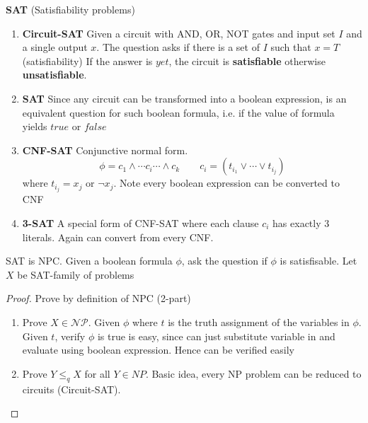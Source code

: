 \documentclass[11pt]{article}
\begin{document}
\begin{example}
    \textbf{SAT} (Satisfiability problems)
    \begin{enumerate}
        \item \textbf{Circuit-SAT} Given a circuit with AND, OR, NOT gates and input set $I$ and a single output $x$. The question asks if there is a set of $I$ such that $x = T$ (satisfiability) If the answer is $yet$, the circuit is \textbf{satisfiable} otherwise \textbf{unsatisfiable}. 
        \item \textbf{SAT} Since any circuit can be transformed into a boolean expression, is an equivalent question for such boolean formula, i.e. if the value of formula yields $true$ or $false$
        \item \textbf{CNF-SAT} Conjunctive normal form. 
        \[
            \phi = c_1 \land \cdots c_i  \cdots \land c_k  \quad \quad c_i = (t_{i_1} \lor \cdots \lor t_{i_j})
        \]
        where $t_{i_j} = x_j$ or $\neg x_j$. Note every boolean expression can be converted to CNF
        \item \textbf{3-SAT} A special form of CNF-SAT where each clause  $c_i$ has exactly 3 literals. Again can convert from every CNF.
    \end{enumerate}
\end{example}

\begin{theorem*}
    SAT is NPC. Given a boolean formula $\phi$, ask the question if $\phi$ is satisfisable. Let $X$ be SAT-family of problems
    \begin{proof}
        Prove by definition of NPC (2-part)
        \begin{enumerate}
            \item Prove $X\in \mathcal{NP}$. Given $\phi$ where $t$ is the truth assignment of the variables in $\phi$. Given $t$, verify $\phi$ is true is easy, since can just substitute variable in and evaluate using boolean expression. Hence can be verified easily
            \item Prove $Y\leq_q X$ for all $Y\in NP$. Basic idea, every NP problem can be reduced to circuits (Circuit-SAT). 
        \end{enumerate}
    \end{proof}
\end{theorem*}
\end{document}
